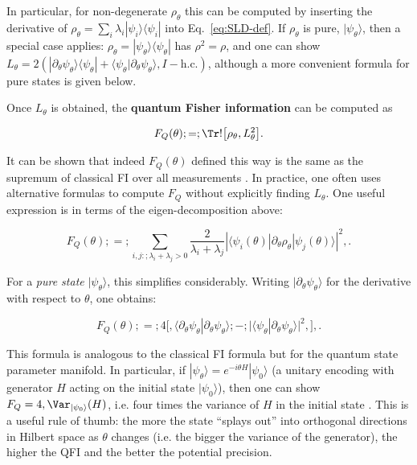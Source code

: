 In particular, for non-degenerate $\rho_\theta$ this can be computed
by inserting the derivative of $\rho_\theta = \sum_i \lambda_i
|\psi_i\rangle\langle\psi_i|$ into Eq.~\eqref{eq:SLD-def}. If
$\rho_\theta$ is pure, $|\psi_\theta\rangle$, then a special case
applies: $\rho_\theta = |\psi_\theta\rangle\langle\psi_\theta|$ has
$\rho^2=\rho$, and one can show $L_\theta = 2(|\partial_\theta
\psi_\theta\rangle\langle \psi_\theta| + \langle
\psi_\theta|\partial_\theta \psi_\theta\rangle, I - \text{h.c.})$,
although a more convenient formula for pure states is given below.



Once $L_\theta$ is obtained, the \textbf{quantum Fisher information} can be computed as

\begin{equation}
F_Q(\theta) ;=; \Tr!\big[\rho_\theta, L_\theta^2\big].
\label{eq:QFI-def}
\end{equation}

It can be shown that indeed $F_Q(\theta)$ defined this way is the same
as the supremum of classical FI over all measurements
\cite{Helstrom1976, Holevo2011, BraunsteinCaves1994}. In practice, one
often uses alternative formulas to compute $F_Q$ without explicitly
finding $L_\theta$. One useful expression is in terms of the
eigen-decomposition above:

\begin{equation}
F_Q(\theta) ;=; \sum_{i,j:; \lambda_i + \lambda_j >0} \frac{2}{\lambda_i + \lambda_j} \left|\langle \psi_i(\theta)|\partial_\theta \rho_\theta|\psi_j(\theta)\rangle\right|^2 ,.
\label{eq:QFI-eigen}
\end{equation}

For a \textit{pure state} $|\psi_\theta\rangle$, this simplifies
considerably. Writing $|\partial_\theta \psi_\theta\rangle$ for the
derivative with respect to $\theta$, one obtains:

\begin{equation}
F_Q(\theta) ;=; 4 \Big[, \langle \partial_\theta \psi_\theta | \partial_\theta \psi_\theta \rangle ;-; \big|\langle \psi_\theta | \partial_\theta \psi_\theta \rangle\big|^2,\Big] ,.
\label{eq:QFI-pure}
\end{equation}

This formula is analogous to the classical FI formula but for the
quantum state parameter manifold. In particular, if
$|\psi_\theta\rangle = e^{-i\theta H}|\psi_0\rangle$ (a unitary
encoding with generator $H$ acting on the initial state
$|\psi_0\rangle$), then one can show $F_Q =
4,\Var_{|\psi_0\rangle}(H)$, i.e. four times the variance of $H$ in
the initial state \cite{BraunsteinCaves1994, Paris2009}. This is a
useful rule of thumb: the more the state “splays out” into orthogonal
directions in Hilbert space as $\theta$ changes (i.e. the bigger the
variance of the generator), the higher the QFI and the better the
potential precision.



